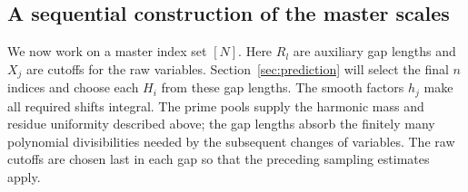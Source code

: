 \subsection{A sequential construction of the master scales}

We now work on a master index set \([N]\). Here \(R_l\) are auxiliary gap
lengths and \(X_j\) are cutoffs for the raw variables.
Section~\ref{sec:prediction} will select the final \(n\) indices and choose
each \(H_i\) from these gap lengths.
The smooth factors \(h_j\) make all required shifts integral.  The prime
pools supply the harmonic mass and residue uniformity described above;
the gap lengths absorb the finitely many polynomial divisibilities
needed by the subsequent changes of variables.  The raw cutoffs are
chosen last in each gap so that the preceding sampling estimates apply.

